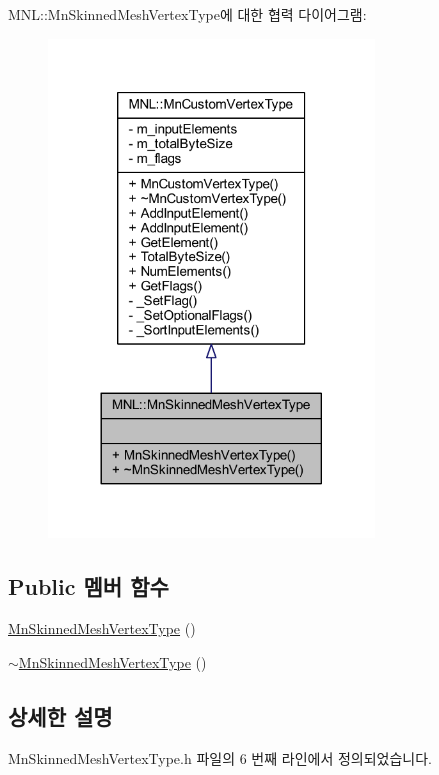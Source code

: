 M\+NL\+:\+:Mn\+Skinned\+Mesh\+Vertex\+Type에 대한 협력 다이어그램\+:\nopagebreak
\begin{figure}[H]
\begin{center}
\leavevmode
\includegraphics[width=245pt]{class_m_n_l_1_1_mn_skinned_mesh_vertex_type__coll__graph}
\end{center}
\end{figure}
\subsection*{Public 멤버 함수}
\begin{DoxyCompactItemize}
\item 
\hyperlink{class_m_n_l_1_1_mn_skinned_mesh_vertex_type_abe942c6fd7df3e6897c1412d0bb85d59}{Mn\+Skinned\+Mesh\+Vertex\+Type} ()
\item 
\hyperlink{class_m_n_l_1_1_mn_skinned_mesh_vertex_type_af6d0b18b1bbb9c876c20550c125a962b}{$\sim$\+Mn\+Skinned\+Mesh\+Vertex\+Type} ()
\end{DoxyCompactItemize}


\subsection{상세한 설명}


Mn\+Skinned\+Mesh\+Vertex\+Type.\+h 파일의 6 번째 라인에서 정의되었습니다.



